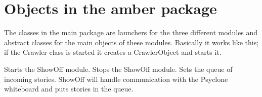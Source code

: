 \section{Objects in the amber package}

The classes in the main package are launchers for the three different modules
and abstract classes for the main objects of these modules. Basically it works
like this; if the Crawler class is started it creates a CrawlerObject and
starts it.


\begin{classmetadata}
\end{classmetadata}

\begin{interface}
\end{interface}




\begin{classmetadata}
\end{classmetadata}

\begin{interface}
\end{interface}




\begin{classmetadata}
\end{classmetadata}

\begin{interface}
\end{interface}




\begin{classmetadata}
\end{classmetadata}

\begin{interface}
    {Starts the ShowOff module.}
    {Stops the ShowOff module.}
    {Sets the queue of incoming stories. ShowOff will handle communication with
    the Psyclone whiteboard and puts stories in the queue.}
\end{interface}




\begin{classmetadata}
\end{classmetadata}

\begin{interface}
\end{interface}




\begin{classmetadata}
\end{classmetadata}

\begin{interface}
\end{interface}

